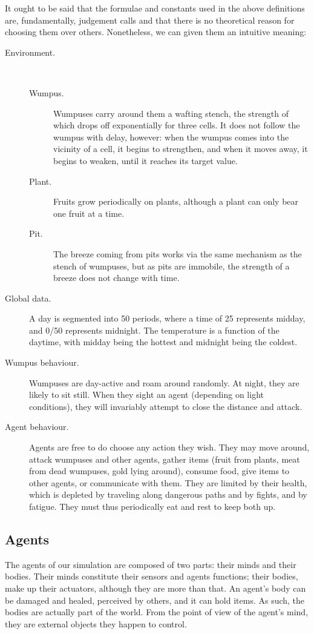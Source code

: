 It ought to be said that the formulae and constants used in the above definitions are, fundamentally, judgement calls and that there is no theoretical reason for choosing them over others. Nonetheless, we can given them an intuitive meaning:
\begin{description}
	\item[Environment.]\ 
	\begin{description}
		\item[Wumpus.] Wumpuses carry around them a wafting stench, the strength of which drops off exponentially for three cells. It does not follow the wumpus with delay, however: when the wumpus comes into the vicinity of a cell, it begins to strengthen, and when it moves away, it begins to weaken, until it reaches its target value.
		\item[Plant.] Fruits grow periodically on plants, although a plant can only bear one fruit at a time.
		\item[Pit.] The breeze coming from pits works via the same mechanism as the stench of wumpuses, but as pits are immobile, the strength of a breeze does not change with time.
	\end{description}
	\item[Global data.] A day is segmented into 50 periods, where a time of 25 represents midday, and 0/50 represents midnight. The temperature is a function of the daytime, with midday being the hottest and midnight being the coldest.
	\item[Wumpus behaviour.] Wumpuses are day-active and roam around randomly. At night, they are likely to sit still. When they sight an agent (depending on light conditions), they will invariably attempt to close the distance and attack.
	\item[Agent behaviour.] Agents are free to do choose any action they wish. They may move around, attack wumpuses and other agents, gather items (fruit from plants, meat from dead wumpuses, gold lying around), consume food, give items to other agents, or communicate with them. They are limited by their health, which is depleted by traveling along dangerous paths and by fights, and by fatigue. They must thus periodically eat and rest to keep both up. 
\end{description}

\subsection{Agents}

The agents of our simulation are composed of two parts: their minds and their bodies. Their minds constitute their sensors and agents functions; their bodies, make up their actuators, although they are more than that. An agent's body can be damaged and healed, perceived by others, and it can hold items. As such, the bodies are actually part of the world. From the point of view of the agent's mind, they are external objects they happen to control.

